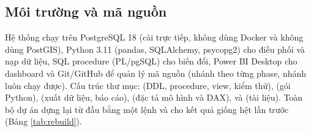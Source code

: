 \subsection{Môi trường và mã nguồn}
Hệ thống chạy trên PostgreSQL 18 (cài trực tiếp, không dùng Docker và không dùng PostGIS), Python 3.11 (pandas, SQLAlchemy, psycopg2) cho điều phối và nạp dữ liệu, SQL procedure (PL/pgSQL) cho biến đổi, Power BI Desktop cho dashboard và Git/GitHub để quản lý mã nguồn (nhánh theo từng phase, nhánh  luôn chạy được). Cấu trúc thư mục:  (DDL, procedure, view, kiểm thử),  (gói Python),  (xuất dữ liệu, báo cáo),  (đặc tả mô hình và DAX),  và  (tài liệu). Toàn bộ dự án dựng lại từ đầu bằng một lệnh  và cho kết quả giống hệt lần trước (Bảng \ref{tab:rebuild}).

